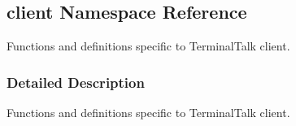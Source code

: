 \hypertarget{namespaceclient}{}\subsection{client Namespace Reference}
\label{namespaceclient}


Functions and definitions specific to Terminal\+Talk client.  




\subsubsection{Detailed Description}
Functions and definitions specific to Terminal\+Talk client. 